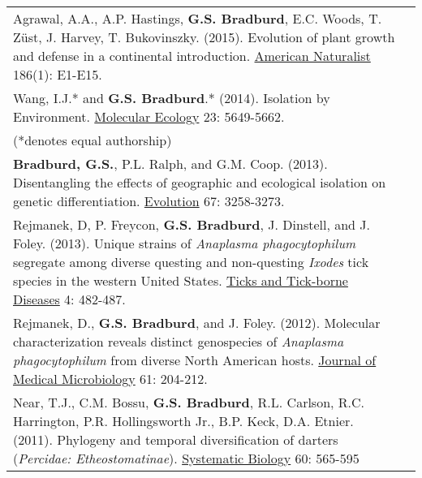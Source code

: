 \documentclass{article}
\begin{document}
\begin{tabular}{>{\everypar{\hangindent1cm}}p{}p{}}
%
\vspace{-0.1cm}
Agrawal, A.A., A.P. Hastings, \textbf{G.S. Bradburd}, E.C. Woods, T. Z{\"u}st, J. Harvey, T. Bukovinszky. (2015).
Evolution of plant growth and defense in a continental introduction. \underline{American Naturalist} 186(1): E1-E15.\\
%
\vspace{-0.1cm}
Wang, I.J.* and \textbf{G.S. Bradburd}.* (2014). Isolation by Environment. \underline{Molecular Ecology} 23: 5649-5662.  & \hfill\\
\hspace{4.5mm} (*denotes equal authorship)&\\
%
\vspace{-0.1cm}
%
\textbf{Bradburd, G.S.}, P.L. Ralph, and G.M. Coop. (2013). Disentangling the effects of geographic and ecological isolation on genetic differentiation. \underline{Evolution} 67: 3258-3273. & \hfill \\
%
\vspace{-0.1cm}
%
Rejmanek, D, P. Freycon, \textbf{G.S. Bradburd}, J. Dinstell, and J. Foley.  (2013). Unique strains of \textit{Anaplasma phagocytophilum} segregate among diverse questing and non-questing \textit{Ixodes} tick species in the western United States.  \underline{Ticks and Tick-borne Diseases} 4: 482-487. & \hfill\\
%
\vspace{-0.1cm}
%
Rejmanek, D., \textbf{G.S. Bradburd}, and J. Foley.  (2012). Molecular characterization reveals distinct genospecies of \textit{Anaplasma phagocytophilum} from diverse North American hosts.	\underline{Journal of Medical Microbiology} 61: 204-212. & \hfill \\
%
\vspace{-0.1cm}
%
Near, T.J., C.M. Bossu, \textbf{G.S. Bradburd}, R.L. Carlson, R.C. Harrington, P.R. Hollingsworth Jr., B.P. Keck, D.A. Etnier.  (2011). Phylogeny and temporal diversification of darters (\textit{Percidae: Etheostomatinae}).  \underline{Systematic Biology} 60: 565-595& \hfill\\
%
\end{tabular}
%
\end{document}
